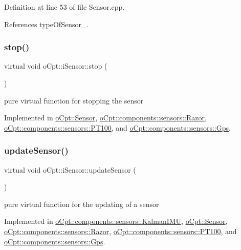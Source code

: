 Definition at line 53 of file Sensor.\+cpp.



References type\+Of\+Sensor\+\_\+.

\hypertarget{classo_cpt_1_1i_sensor_aa85c22a8c8f7c2445379e1f82835f8dc}{}\label{classo_cpt_1_1i_sensor_aa85c22a8c8f7c2445379e1f82835f8dc} 
\subsubsection{\texorpdfstring{stop()}{stop()}}
{\footnotesize\ttfamily virtual void o\+Cpt\+::i\+Sensor\+::stop (\begin{DoxyParamCaption}{ }\end{DoxyParamCaption})\hspace{0.3cm}{\ttfamily [pure virtual]}}

pure virtual function for stopping the sensor 

Implemented in \hyperlink{classo_cpt_1_1_sensor_a44ad78c2c091ca9cf72295293f8c5b74}{o\+Cpt\+::\+Sensor}, \hyperlink{classo_cpt_1_1components_1_1sensors_1_1_razor_a807441c137892ee3c1b612c284893fa1}{o\+Cpt\+::components\+::sensors\+::\+Razor}, \hyperlink{classo_cpt_1_1components_1_1sensors_1_1_p_t100_a6d80e18a58cf4e1b9b6ce82b441209e2}{o\+Cpt\+::components\+::sensors\+::\+P\+T100}, and \hyperlink{classo_cpt_1_1components_1_1sensors_1_1_gps_a9206c32fa91311740ae920c01eed6094}{o\+Cpt\+::components\+::sensors\+::\+Gps}.

\hypertarget{classo_cpt_1_1i_sensor_aa55bc04979e4852989af2bd4f64e70bc}{}\label{classo_cpt_1_1i_sensor_aa55bc04979e4852989af2bd4f64e70bc} 
\subsubsection{\texorpdfstring{update\+Sensor()}{updateSensor()}}
{\footnotesize\ttfamily virtual void o\+Cpt\+::i\+Sensor\+::update\+Sensor (\begin{DoxyParamCaption}{ }\end{DoxyParamCaption})\hspace{0.3cm}{\ttfamily [pure virtual]}}

pure virtual function for the updating of a sensor 

Implemented in \hyperlink{classo_cpt_1_1components_1_1sensors_1_1_kalman_i_m_u_acc4f666db05d6355772a67ae2f06faef}{o\+Cpt\+::components\+::sensors\+::\+Kalman\+I\+MU}, \hyperlink{classo_cpt_1_1_sensor_ab4b0dedb06f11bcf2368852035beb2b2}{o\+Cpt\+::\+Sensor}, \hyperlink{classo_cpt_1_1components_1_1sensors_1_1_razor_ac8ee1582eb5c478c73e5e050858d2d7d}{o\+Cpt\+::components\+::sensors\+::\+Razor}, \hyperlink{classo_cpt_1_1components_1_1sensors_1_1_p_t100_a66619675288a5344a55242d9bf097aee}{o\+Cpt\+::components\+::sensors\+::\+P\+T100}, and \hyperlink{classo_cpt_1_1components_1_1sensors_1_1_gps_a95976c5d8bba650d2732d4eb43979283}{o\+Cpt\+::components\+::sensors\+::\+Gps}.



